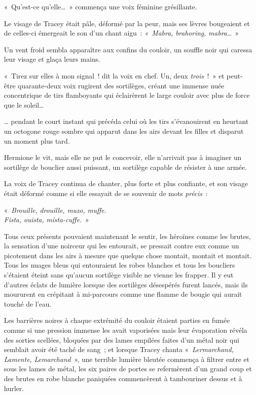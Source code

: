 «~Qu'est-ce qu'elle…~»
commença une voix féminine grésillante.

Le visage de Tracey était pâle, déformé par la peur, mais ses lèvres bougeaient et de celles-ci émergeait le son d'un chant aigu~: \emph{«~Mabra, brahoring, mabra…}~»

Un vent froid sembla apparaître aux confins du couloir, un souffle noir qui caressa leur visage et glaça leurs mains.

«~Tirez sur elles à mon signal~! dit la voix en chef.
Un, deux \emph{trois}~!~»
et peut-être quarante-deux voix rugirent des sortilèges, créant une immense nuée concentrique de tirs flamboyants qui éclairèrent le large couloir avec plus de force que le soleil…

… pendant le court instant qui précéda celui où les tirs s'évanouirent en heurtant un octogone rouge sombre qui apparut dans les airs devant les filles et disparut un moment plus tard.

Hermione le vit, mais elle ne put le concevoir, elle n'arrivait pas à imaginer un sortilège de bouclier aussi puissant, un sortilège capable de résister à une armée.

La voix de Tracey continua de chanter, plus forte et plus confiante, et son visage était déformé comme si elle essayait de se souvenir de mots \emph{précis}~:

«~\emph{Brouille, drouille, muzo, muffe.\\
Fista, ouista, mista-cuffe.}~»

Tous ceux présents pouvaient maintenant le sentir, les héroïnes comme les brutes, la sensation d'une noirceur qui les entourait, se pressait contre eux comme un picotement dans les airs à mesure que quelque chose montait, montait et montait.
Tous les nuages bleus qui entouraient les robes blanches et tous les boucliers s'étaient éteint sans qu'aucun sortilège visible ne vienne les frapper.
Il y eut d'autres éclats de lumière lorsque des sortilèges désespérés furent lancés, mais ils moururent en crépitant à mi-parcours comme une flamme de bougie qui aurait touché de l'eau.

Les barrières noires à chaque extrémité du couloir étaient parties en fumée comme si une pression immense les avait vaporisées mais leur évaporation révéla des sorties scellées, bloquées par des lames empilées faites d'un métal noir qui semblait avoir été taché de sang~; et lorsque Tracey chanta «~\emph{Lermarchand, Lamente, Lemarchand}~», une terrible lumière bleutée commença à filtrer entre et sous les lames de métal, les six paires de portes se refermèrent d'un grand coup et des brutes en robe blanche paniquées commencèrent à tambouriner dessus et à hurler.

